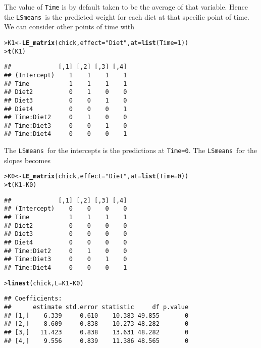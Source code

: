 \documentclass[11pt]{article}\usepackage[]{graphicx}\usepackage[]{color}
\makeatletter
\newcommand{\hlnum}[1]{\textcolor[rgb]{0.686,0.059,0.569}{#1}}%
\newcommand{\hlstr}[1]{\textcolor[rgb]{0.192,0.494,0.8}{#1}}%
\newcommand{\hlopt}[1]{\textcolor[rgb]{0,0,0}{#1}}%
\newcommand{\hlstd}[1]{\textcolor[rgb]{0.345,0.345,0.345}{#1}}%
\newcommand{\hlkwb}[1]{\textcolor[rgb]{0.69,0.353,0.396}{#1}}%
\newcommand{\hlkwc}[1]{\textcolor[rgb]{0.333,0.667,0.333}{#1}}%
\newcommand{\hlkwd}[1]{\textcolor[rgb]{0.737,0.353,0.396}{\textbf{#1}}}%
\newenvironment{kframe}{%
 \def\at@end@of@kframe{}%
 \ifinner\ifhmode%
  \def\at@end@of@kframe{\end{minipage}}%
  \begin{minipage}{\columnwidth}%
 \fi\fi%
 \def\FrameCommand##1{\hskip\@totalleftmargin \hskip-\fboxsep
 \colorbox{shadecolor}{##1}\hskip-\fboxsep
     \hskip-\linewidth \hskip-\@totalleftmargin \hskip\columnwidth}%
 \MakeFramed {\advance\hsize-\width
   \@totalleftmargin\z@ \linewidth\hsize
   \@setminipage}}%
 {\par\unskip\endMakeFramed%
 \at@end@of@kframe}
\newenvironment{knitrout}{}{} %
\def\code#1{\texttt{#1}}
\def\cc#1{\texttt{#1}}
\def\lsmeans{\code{LSmeans}}
\renewenvironment{knitrout}{
  \begin{oldknitrout}
    \footnotesize
    \topsep=0pt
}{
  \end{oldknitrout}
}
\makeatother
\begin{document}
The value of \cc{Time} is by default taken to be the average of that
variable. Hence the \lsmeans\ is the predicted weight for each diet at
that specific point of time. We can consider other points of time with
\begin{knitrout}
\color{fgcolor}\begin{kframe}
\begin{alltt}
\hlstd{> }\hlstd{K1} \hlkwb{<-} \hlkwd{LE_matrix}\hlstd{(chick,} \hlkwc{effect}\hlstd{=}\hlstr{"Diet"}\hlstd{,} \hlkwc{at}\hlstd{=}\hlkwd{list}\hlstd{(}\hlkwc{Time}\hlstd{=}\hlnum{1}\hlstd{))}
\hlstd{> }\hlkwd{t}\hlstd{(K1)}
\end{alltt}
\begin{verbatim}
##             [,1] [,2] [,3] [,4]
## (Intercept)    1    1    1    1
## Time           1    1    1    1
## Diet2          0    1    0    0
## Diet3          0    0    1    0
## Diet4          0    0    0    1
## Time:Diet2     0    1    0    0
## Time:Diet3     0    0    1    0
## Time:Diet4     0    0    0    1
\end{verbatim}
\end{kframe}
\end{knitrout}

The \lsmeans\ for the intercepts is the predictions at
\cc{Time=0}. The \lsmeans\ for the slopes becomes
\begin{knitrout}
\color{fgcolor}\begin{kframe}
\begin{alltt}
\hlstd{> }\hlstd{K0} \hlkwb{<-} \hlkwd{LE_matrix}\hlstd{(chick,} \hlkwc{effect}\hlstd{=}\hlstr{"Diet"}\hlstd{,} \hlkwc{at}\hlstd{=}\hlkwd{list}\hlstd{(}\hlkwc{Time}\hlstd{=}\hlnum{0}\hlstd{))}
\hlstd{> }\hlkwd{t}\hlstd{(K1} \hlopt{-} \hlstd{K0)}
\end{alltt}
\begin{verbatim}
##             [,1] [,2] [,3] [,4]
## (Intercept)    0    0    0    0
## Time           1    1    1    1
## Diet2          0    0    0    0
## Diet3          0    0    0    0
## Diet4          0    0    0    0
## Time:Diet2     0    1    0    0
## Time:Diet3     0    0    1    0
## Time:Diet4     0    0    0    1
\end{verbatim}
\begin{alltt}
\hlstd{> }\hlkwd{linest}\hlstd{(chick,} \hlkwc{L}\hlstd{=K1} \hlopt{-} \hlstd{K0)}
\end{alltt}
\begin{verbatim}
## Coefficients:
##      estimate std.error statistic     df p.value
## [1,]    6.339     0.610    10.383 49.855       0
## [2,]    8.609     0.838    10.273 48.282       0
## [3,]   11.423     0.838    13.631 48.282       0
## [4,]    9.556     0.839    11.386 48.565       0
\end{verbatim}
\end{kframe}
\end{knitrout}
\end{document}
